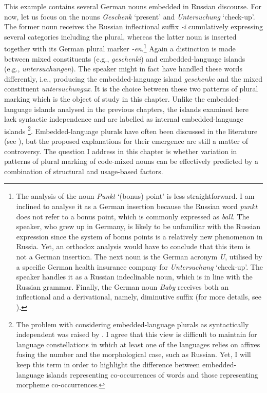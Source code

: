 \noindent This example contains several German nouns embedded in Russian discourse. For now, let us focus on the nouns \textit{Geschenk} ‘present’ and \textit{Untersuchung} ‘check-up’. The former noun receives the Russian inflectional suffix \textit{-i} cumulatively expressing several categories including the plural, whereas the latter noun is inserted together with its German plural marker \textit{-en}.\footnote{The analysis of the noun \textit{Punkt} ‘(bonus) point’ is less straightforward. I am inclined to analyse it as a German insertion because the Russian word \textit{punkt} does not refer to a bonus point, which is commonly expressed as \textit{ball}. The speaker, who grew up in Germany, is likely to be unfamiliar with the Russian expression since the system of bonus points is a relatively new phenomenon in Russia. Yet, an orthodox analysis would have to conclude that this item is not a German insertion. The next noun is the German acronym \textit{U}, utilised by a specific German health insurance company for \textit{Untersuchung} ‘check-up’. The speaker handles it as a Russian indeclinable noun, which is in line with the Russian grammar. Finally, the German noun \textit{Baby} receives both an inflectional and a derivational, namely, diminutive suffix (for more details, see ).} Again a distinction is made between mixed constituents (e.g., \textit{geschenki}) and embedded-language islands (e.g., \textit{untersuchungen}). The speaker might in fact have handled these words differently, i.e., producing the embedded-language island \textit{geschenke} and the mixed constituent \textit{untersuchungax}. It is the choice between these two patterns of plural marking which is the object of study in this chapter. Unlike the embedded-language islands analysed in the previous chapters, the islands examined here lack syntactic independence and are labelled as internal embedded-language islands \citep[][149--150]{myers-scotton-contact-2002}\footnote{The problem with considering embedded-language plurals as syntactically independent was raised by \citet[][36--37]{boumans-syntax-1998}. I agree that this view is difficult to maintain for language constellations in which at least one of the languages relies on affixes fusing the number and the morphological case, such as Russian. Yet, I will keep this term in order to highlight the difference between embedded-language islands representing co-occurrences of words and those representing morpheme co-occurrences.}. Embedded-language plurals have often been discussed in the literature (see \citealt{backus-two-1996, backus-evidence-1999, backus-units-2003, boumans-syntax-1998, muhamedowa-untersuchung-2006,myers-scotton-duelling-1993, myers-scotton-contact-2002}), but the proposed explanations for their emergence are still a matter of controversy. The question I address in this chapter is whether variation in patterns of plural marking of code-mixed nouns can be effectively predicted by a combination of structural and usage-based factors.

